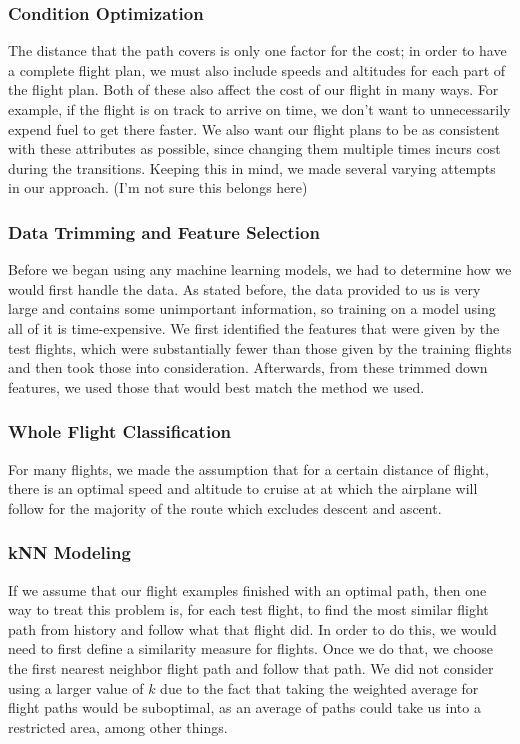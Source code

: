 \documentclass{article}[12pt]
\begin{document}
\begin{multicols}{2}
\subsubsection{Condition Optimization}
The distance that the path covers is only one factor for the cost; in order to have a complete flight plan, we must also include speeds and altitudes for each part of the flight plan. Both of these also affect the cost of our flight in many ways. For example, if the flight is on track to arrive on time, we don't want to unnecessarily expend fuel to get there faster. We also want our flight plans to be as consistent with these attributes as possible, since changing them multiple times incurs cost during the transitions. Keeping this in mind, we made several varying attempts in our approach. (I'm not sure this belongs here)

\subsubsection{Data Trimming and Feature Selection}

Before we began using any machine learning models, we had to determine how we would first handle the data. As stated before, the data provided to us is very large and contains some unimportant information, so training on a model using all of it is time-expensive. We first identified the features that were given by the test flights, which were substantially fewer than those given by the training flights and then took those into consideration. Afterwards, from these trimmed down features, we used those that would best match the method we used. 


\subsubsection{Whole Flight Classification}
For many flights, we made the assumption that for a certain distance of flight, there is an optimal speed and altitude to cruise at at which the airplane will follow for the majority of the route which excludes descent and ascent. 
\subsubsection{kNN Modeling}

If we assume that our flight examples finished with an optimal path, then one way to treat this problem is, for each test flight, to find the most similar flight path from history and follow what that flight did. In order to do this, we would need to first define a similarity measure for flights. Once we do that, we choose the first nearest neighbor flight path and follow that path. We did not consider using a larger value of $k$ due to the fact that taking the weighted average for flight paths would be suboptimal, as an average of paths could take us into a restricted area, among other things.



\end{multicols}
\end{document}
